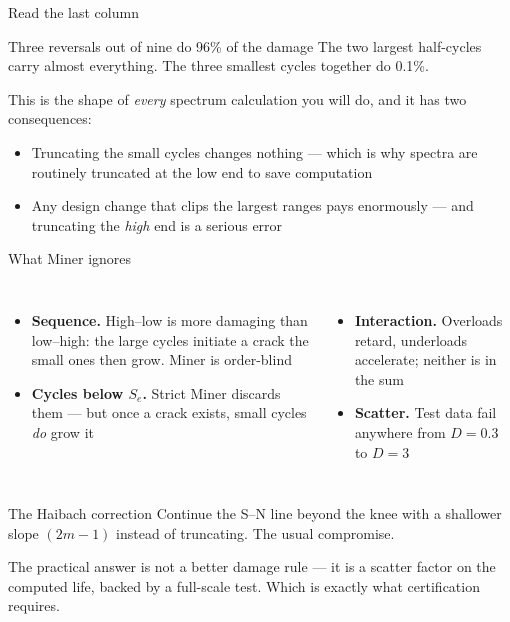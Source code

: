 \documentclass[aspectratio=169,10pt]{beamer}
\begin{document}
\begin{frame}{Read the last column}
\begin{alertblock}{Three reversals out of nine do 96\% of the damage}
The two largest half-cycles carry almost everything. The three smallest cycles together do 0.1\%.
\end{alertblock}
\vspace{4pt}
This is the shape of \emph{every} spectrum calculation you will do, and it has two consequences:
\begin{itemize}
  \item \alert{Truncating the small cycles changes nothing} --- which is why spectra are routinely truncated at the low end to save computation
  \item \alert{Any design change that clips the largest ranges pays enormously} --- and truncating the \emph{high} end is a serious error
\end{itemize}
\end{frame}

\begin{frame}{What Miner ignores}
\begin{columns}[T]
\begin{itemize}\footnotesize
  \item \textbf{Sequence.} High--low is more damaging than low--high: the large cycles initiate a crack the small ones then grow. Miner is order-blind
  \item \textbf{Cycles below $S_e$.} Strict Miner discards them --- but once a crack exists, small cycles \emph{do} grow it
\end{itemize}
\begin{itemize}\footnotesize
  \item \textbf{Interaction.} Overloads retard, underloads accelerate; neither is in the sum
  \item \textbf{Scatter.} Test data fail anywhere from $D=0.3$ to $D=3$
\end{itemize}
\end{columns}
\vspace{4pt}
\begin{block}{The Haibach correction}
\footnotesize Continue the S--N line beyond the knee with a shallower slope $(2m-1)$ instead of truncating. The usual compromise.
\end{block}
\begin{alertblock}{}
The practical answer is not a better damage rule --- it is a \alert{scatter factor} on the computed life, backed by a full-scale test. Which is exactly what certification requires.
\end{alertblock}
\end{frame}
\end{document}
